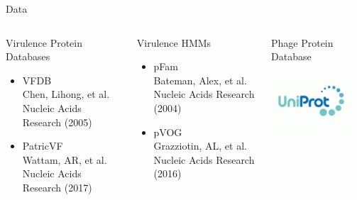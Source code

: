 \documentclass[11pt]{beamer}
\begin{document}
	\begin{frame}{Data}
	\begin{columns}
	\begin{block}{Virulence Protein Databases}
		\begin{itemize}
			\item VFDB \\ \tiny{Chen, Lihong, et al. Nucleic Acids Research (2005)}
			\item \large{PatricVF} \\ \tiny{Wattam, AR, et al. Nucleic Acids Research (2017)}
		\end{itemize}
	\end{block}
	\begin{block}{Virulence HMMs}
	\begin{itemize}
		\item pFam \\ \tiny{Bateman, Alex, et al. Nucleic Acids Research (2004)}
		\item \large{pVOG} \\ \tiny{Grazziotin, AL, et al. Nucleic Acids Research (2016)}
	\end{itemize}
	\end{block}
	
	
	\begin{block}{Phage Protein Database}
	\includegraphics[height=3cm, width=3cm]{uniprot.png}
	\end{block}
	\end{columns}
	\end{frame}
\end{document}
